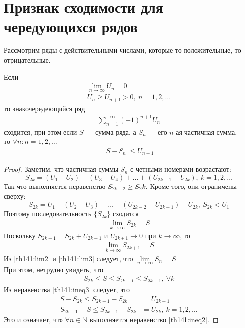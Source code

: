 \section{Признак сходимости для чередующихся рядов}
Рассмотрим ряды с действительными числами, которые то положительные, то
отрицательные.

\begin{theorem}[Лейбница]
  Если
  \begin{gather}
    \lim\limits_{n \to \infty} U_n = 0 \label{th141:lim1} \\
    U_n \geq U_{n+1} > 0, \ n = 1, 2, \dots \label{th141:ineq1}
  \end{gather}
  то знакочередеющийся ряд
  \begin{gather}
    \sum\limits_{n = 1}^{+\infty} {(-1)}^{n+1} U_n \label{th141:sum1}
  \end{gather}
  сходится, при этом если $S$ --- сумма ряда, а $S_n$ --- его $n$-ая частичная
  сумма,\\ то $\forall n: n = 1, 2, \dots$
  \begin{gather}
    |S - S_n| \leq U_{n+1} \label{th141:ineq2}
  \end{gather}
\end{theorem}

\begin{proof}
  Заметим, что частичная суммы $S_n$ с четными номерами возрастают:
  $$S_{2k} = (U_1 - U_2) + (U_3 - U_4) + \dots + (U_{2k - 1} - U_{2k}), \
  k = 1, 2, \dots $$
  Так что выполняется неравенство $S_{2k + 2} \geq S_2k$. Кроме того, они
  ограничены сверху:
  $$S_{2k} = U_1 - (U_2 - U_3) - \dots - (U_{2k - 2} - U_{2k - 1}) - U_{2k}, \
  S_{2k} < U_1$$
  Поэтому последовательность $\{S_{2k}\}$ сходится
  \begin{gather}
    \lim\limits_{k \to \infty} S_{2k} = S \label{th141:lim2}
  \end{gather}
  Поскольку $S_{2k + 1} = S_{2k} + U_{2k + 1}$ и $U_{2k + 1} \to 0$ при
  $k \to \infty$, то
  \begin{gather}
    \lim\limits_{k \to \infty} S_{2k + 1} = S \label{th141:lim3}
  \end{gather}
  Из \eqref{th141:lim2} и \eqref{th141:lim3} следует, что
  $\lim\limits_{n \to \infty} S_n = S$ \\
  При этом, нетрудно увидеть, что
  \begin{gather}
    S_{2k} \leq S \leq S_{2k + 1} \leq S_{2k - 1}, \ \forall k \label{th141:ineq3}
  \end{gather}
  Из неравенства \eqref{th141:ineq3} следует, что
  \begin{align*}
    S - S_{2k} \leq S_{2k + 1} - S_{2k} &= U_{2k + 1} \\
    S_{2k - 1} - S \leq S_{2k - 1} - S_{2k} &= U_{2k}, \ k = 1, 2, \dots
  \end{align*}
  Это и означает, что $\forall n \in \mathbb{N}$ выполняется
  неравенство \eqref{th141:ineq2}.
\end{proof}

